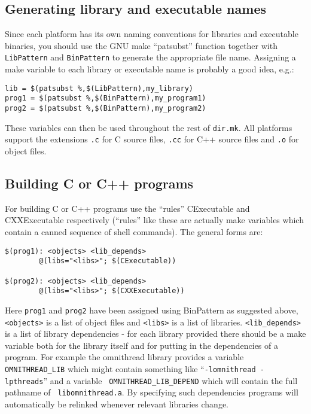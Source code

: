 \documentclass[11pt]{article}
\begin{document}
\subsection{Generating library and executable names}

Since each platform has its own naming conventions for libraries and executable
binaries, you should use the GNU make ``patsubst'' function together with {\tt
LibPattern} and {\tt BinPattern} to generate the appropriate file name.
Assigning a make variable to each library or executable name is probably a good
idea, e.g.:

\begin{verbatim}
lib = $(patsubst %,$(LibPattern),my_library)
prog1 = $(patsubst %,$(BinPattern),my_program1)
prog2 = $(patsubst %,$(BinPattern),my_program2)
\end{verbatim}

These variables can then be used throughout the rest of {\tt dir.mk}.  All
platforms support the extensions {\tt .c} for C source files, {\tt .cc} for C++
source files and {\tt .o} for object files.

\subsection{Building C or C++ programs}

For building C or C++ programs use the ``rules'' CExecutable and CXXExecutable
respectively (``rules'' like these are actually make variables which contain a
canned sequence of shell commands).  The general forms are:

\begin{verbatim}
$(prog1): <objects> <lib_depends>
        @(libs="<libs>"; $(CExecutable))

$(prog2): <objects> <lib_depends>
        @(libs="<libs>"; $(CXXExecutable))
\end{verbatim}

Here {\tt prog1} and {\tt prog2} have been assigned using BinPattern as
suggested above, {\tt <objects>} is a list of object files and {\tt <libs>} is
a list of libraries.  {\tt <lib\_depends>} is a list of library dependencies -
for each library provided there should be a make variable both for the library
itself and for putting in the dependencies of a program.  For example the
omnithread library provides a variable {\tt OMNITHREAD\_LIB} which might
contain something like ``{\tt -lomnithread -lpthreads}'' and a variable {\tt
OMNITHREAD\_LIB\_DEPEND} which will contain the full pathname of {\tt
libomnithread.a}.  By specifying such dependencies programs will automatically
be relinked whenever relevant libraries change.
\end{document}
